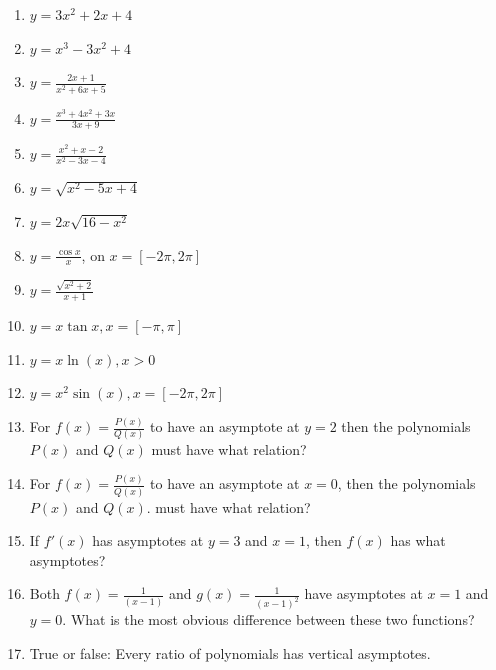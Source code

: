 \documentclass{exercises}
\begin{document}
\begin{enumerate}[resume]
\item $y=3x^{2}+2x+4$
\item $y=x^{3}-3x^{2}+4$
\item $y=\frac{2x+1}{x^{2}+6x+5}$
\item $y=\frac{x^{3}+4x^{2}+3x}{3x+9}$
\item $y=\frac{x^{2}+x-2}{x^{2}-3x-4}$
\item $y=\sqrt{x^{2}-5x+4}$
\item $y=2x\sqrt{16-x^{2}}$
\item $y=\frac{\cos x}{x}$, on $x=[-2\pi,2\pi]$
\item $y=\frac{\sqrt{x^{2}+2}}{x+1}$
\item $y=x\tan x,x=[-\pi,\pi]$
\item $y=x\ln(x),x>0$
\item $y=x^{2}\sin(x),x=[-2\pi,2\pi]$
\item For $f(x)=\frac{P(x)}{Q(x)}$ to have an asymptote at $y=2$ then the polynomials $P(x)$ and $Q(x)$ must have what relation?
\item For $f(x)=\frac{P(x)}{Q(x)}$ to have an asymptote at $x=0$, then the polynomials $P(x)$ and $Q(x)$. must have what relation?
\item If $f'(x)$ has asymptotes at $y=3$ and $x=1$, then $f(x)$ has what asymptotes?
\item Both $f(x)=\frac{1}{(x-1)}$ and $g(x)=\frac{1}{{(x-1)}^{2}}$ have asymptotes at $x=1$ and $y=0$. What is the most obvious difference between these two functions?
\item True or false: Every ratio of polynomials has vertical asymptotes.
\end{enumerate}
\end{document}
